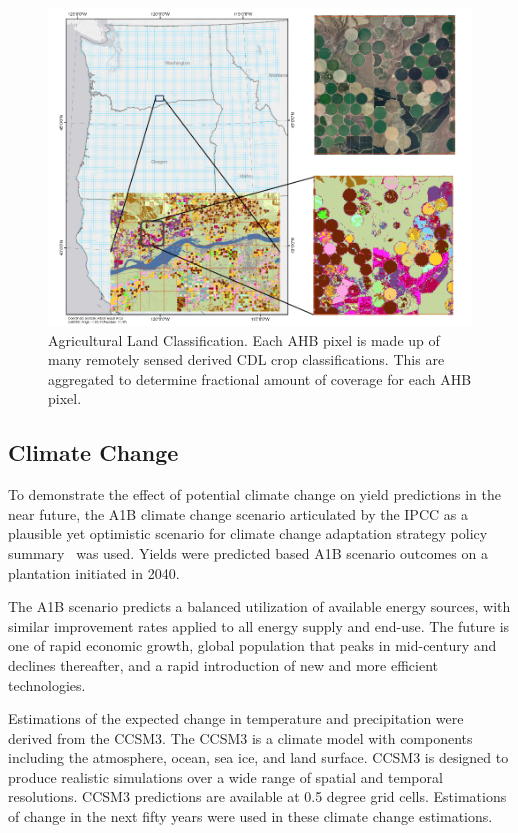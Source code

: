 \documentclass[preprint,12pt]{elsarticle}
\begin{document}
\begin{figure}[hp]
  \centering
  \includegraphics[width=1\linewidth]{land.png}
  \caption{Agricultural Land Classification.  Each \ac{AHB} pixel is made up of
    many remotely sensed derived \ac{CDL} crop classifications.  This
    are aggregated to determine fractional amount of coverage for each
    \ac{AHB} pixel. }
  \label{fig:land}
\end{figure}

\subsection{Climate Change}

To demonstrate the effect of potential climate change on yield
predictions in the near future, the A1B climate change scenario
articulated by the \ac{IPCC} as a plausible yet optimistic
scenario for climate change adaptation strategy policy summary~\cite{IPCC2007,Parry2007} was
used. Yields were predicted based A1B scenario outcomes on a
plantation initiated in 2040.

The A1B scenario predicts a balanced utilization of available energy
sources, with similar improvement rates applied to all energy supply
and end-use.  The future is one of rapid economic growth, global
population that peaks in mid-century and declines thereafter, and a
rapid introduction of new and more efficient
technologies.

Estimations of the expected change in temperature and precipitation
were derived from the \ac{CCSM3}.  The \ac{CCSM3} is a climate model
with components including the atmosphere, ocean, sea ice, and land
surface. \ac{CCSM3} is designed to produce realistic simulations over
a wide range of spatial and temporal resolutions.  \ac{CCSM3}
predictions are available at 0.5 degree grid cells.  Estimations of
change in the next fifty years were used in these climate change
estimations.
\end{document}
